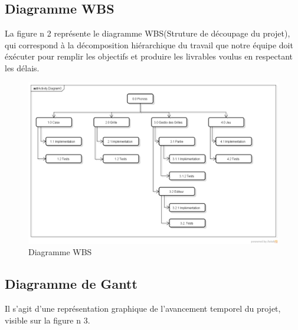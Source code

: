 \documentclass[11pt]{article}
\begin{document}
\newpage
\subsection{Diagramme WBS}

La figure n 2 représente le diagramme WBS(Struture de découpage du projet), qui correspond à la décomposition hiérarchique du travail que notre équipe doit éxécuter pour remplir les objectifs et produire les livrables voulus en respectant les délais.
	
\begin{figure}[!ht]
		\centering
		\includegraphics[width=18cm]{./Diagrammes/Diagramme_WBS/WBS.png}
		\caption{Diagramme WBS}
\end{figure}

\newpage
\subsection{Diagramme de Gantt}
Il s'agit d'une représentation graphique de l'avancement temporel du projet, visible sur la figure n 3.
\end{document}
